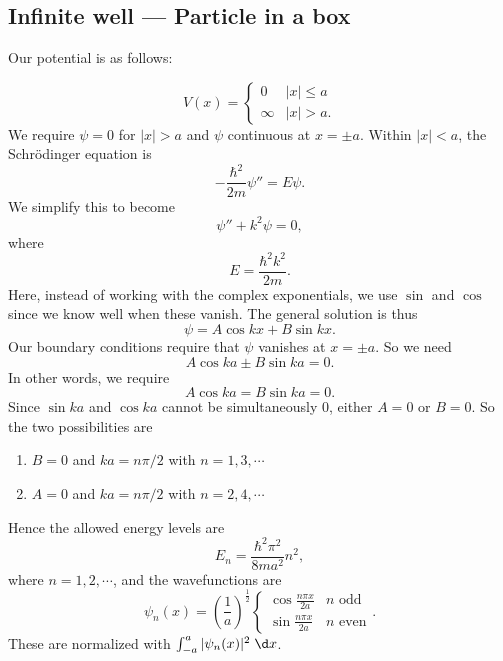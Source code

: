 \documentclass[a4paper]{article}
\begin{document}
\subsection{Infinite well --- Particle in a box}
Our potential is as follows:
\begin{center}
\end{center}
\[
  V(x) =
  \begin{cases}
    0 & |x| \leq a\\
    \infty & |x| > a.
  \end{cases}
\]
We require $\psi = 0$ for $|x| > a$ and $\psi$ continuous at $x = \pm a$. Within $|x| < a$, the Schr\"odinger equation is
\[
  -\frac{\hbar^2}{2m}\psi'' = E\psi.
\]
We simplify this to become
\[
  \psi'' + k^2 \psi = 0,
\]
where
\[
  E = \frac{\hbar^2 k^2}{2m}.
\]
Here, instead of working with the complex exponentials, we use $\sin$ and $\cos$ since we know well when these vanish. The general solution is thus
\[
  \psi = A\cos kx + B\sin kx.
\]
Our boundary conditions require that $\psi$ vanishes at $x = \pm a$. So we need
\[
  A \cos ka \pm B\sin ka = 0.
\]
In other words, we require
\[
  A\cos ka = B\sin ka = 0.
\]
Since $\sin ka$ and $\cos ka$ cannot be simultaneously $0$, either $A = 0$ or $B = 0$. So the two possibilities are
\begin{enumerate}
  \item $B = 0$ and $ka = n\pi/2$ with $n = 1, 3, \cdots$
  \item $A = 0$ and $ka = n\pi/2$ with $n = 2, 4, \cdots$
\end{enumerate}
Hence the allowed energy levels are
\[
  E_n = \frac{\hbar^2 \pi^2}{8ma^2} n^2,
\]
where $n = 1, 2, \cdots$, and the wavefunctions are
\[
  \psi_n(x) = \left(\frac{1}{a}\right)^{\frac{1}{2}}
  \begin{cases}
    \cos \frac{n\pi x}{2a} & n\text{ odd}\\
    \sin \frac{n\pi x}{2a} & n\text{ even}
  \end{cases}.
\]
These are normalized with $\int_{-a}^a |\psi_n(x)|^2 \;\d x$.
\end{document}
